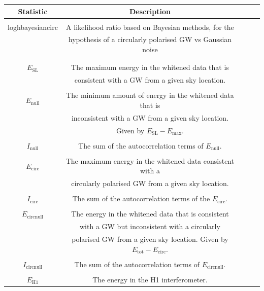\documentclass[11pt]{cuthesis}
\begin{document}
 \begin{table} \label{tab:labels}
\begin{tabular}{| c | c | c | c | c |} 
 \hline
\textbf{Statistic }& \textbf{Description}  \\ [0.5ex] 
 \hline\hline
& \\ 
loghbayesiancirc & A likelihood ratio based on Bayesian methods, for the \\ & hypothesis of a circularly polarised GW vs Gaussian noise\\ & \cite{was_xpipeline}  \\

\hline
& \\
$E_\text{SL}$ & The maximum energy in the whitened data that is \\ & consistent with a GW from a given sky location. \\

\hline
& \\
$E_\text{null}$& The minimum amount of energy in the whitened data that is\\ & inconsistent with a GW from a given sky location. \\ & Given by $E_\text{SL}-E_\text{max}$. \\
\hline
& \\
$I_\text{null}$& The sum of the autocorrelation terms of $E_\text{null}$. \\

\hline
& \\
$E_\text{circ}$ & The maximum energy in the whitened data consistent with a\\ & circularly polarised GW from a given sky location.  \\
\hline
& \\
$I_\text{circ}$ & The sum of the autocorrelation terms of the $E_\text{circ}$. \\

\hline
& \\
$E_\text{circnull}$ & The energy in the whitened data that is consistent \\ & with a GW but inconsistent with a circularly \\ & polarised GW from a given sky location. Given by $E_\text{tot}-E_\text{circ}$. \\

\hline
& \\
$I_\text{circnull}$& The sum of the autocorrelation terms of $E_\text{circnull}$.  \\
\hline
& \\
$E_\text{H1}$& The energy in the H1 interferometer. \\


\end{tabular}
\end{table}
\end{document}
